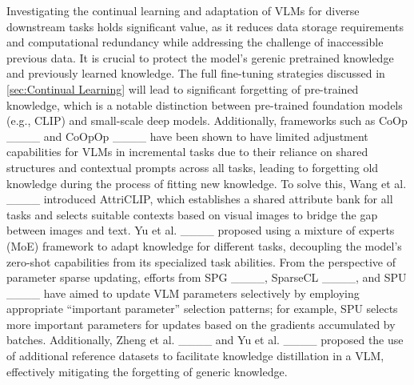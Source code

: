 Investigating the continual learning and adaptation of VLMs for diverse downstream tasks holds significant value, as it reduces data storage requirements and computational redundancy while addressing the challenge of inaccessible previous data. It is crucial to protect the model's gerenic pretrained knowledge and previously learned knowledge. The full fine-tuning strategies discussed in \ref{sec:Continual Learning} will lead to significant forgetting of pre-trained knowledge, which is a notable distinction between pre-trained foundation models (e.g., CLIP) and small-scale deep models. Additionally, frameworks such as CoOp ____ and CoOpOp ____ have been shown to have limited adjustment capabilities for VLMs in incremental tasks due to their reliance on shared structures and contextual prompts across all tasks, leading to forgetting old knowledge during the process of fitting new knowledge. To solve this, Wang et al. ____ introduced AttriCLIP, which establishes a shared attribute bank for all tasks and selects suitable contexts based on visual images to bridge the gap between images and text. Yu et al. ____ proposed using a mixture of experts (MoE) framework to adapt knowledge for different tasks, decoupling the model's zero-shot capabilities from its specialized task abilities. From the perspective of parameter sparse updating, efforts from SPG ____, SparseCL ____, and SPU ____ have aimed to update VLM parameters selectively by employing appropriate “important parameter” selection patterns; for example, SPU selects more important parameters for updates based on the gradients accumulated by batches. Additionally, Zheng et al. ____ and Yu et al. ____ proposed the use of additional reference datasets to facilitate knowledge distillation in a VLM, effectively mitigating the forgetting of generic knowledge.